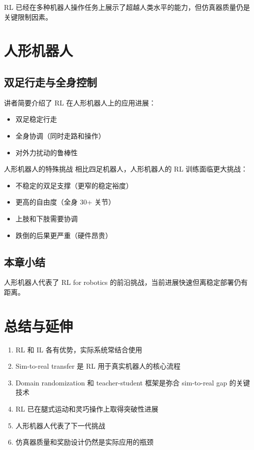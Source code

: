 \documentclass[a4paper]{article}
\begin{document}
RL 已经在多种机器人操作任务上展示了超越人类水平的能力，但仿真器质量仍是关键限制因素。

\section{人形机器人}

\subsection{双足行走与全身控制}

讲者简要介绍了 RL 在人形机器人上的应用进展：
\begin{itemize}
    \item 双足稳定行走
    \item 全身协调（同时走路和操作）
    \item 对外力扰动的鲁棒性
\end{itemize}

\begin{knowledgebox}{人形机器人的特殊挑战}
相比四足机器人，人形机器人的 RL 训练面临更大挑战：
\begin{itemize}
    \item 不稳定的双足支撑（更窄的稳定裕度）
    \item 更高的自由度（全身 30+ 关节）
    \item 上肢和下肢需要协调
    \item 跌倒的后果更严重（硬件昂贵）
\end{itemize}
\end{knowledgebox}

\subsection{本章小结}

人形机器人代表了 RL for robotics 的前沿挑战，当前进展快速但离稳定部署仍有距离。

\section{总结与延伸}

\begin{enumerate}
    \item RL 和 IL 各有优势，实际系统常结合使用
    \item Sim-to-real transfer 是 RL 用于真实机器人的核心流程
    \item Domain randomization 和 teacher-student 框架是弥合 sim-to-real gap 的关键技术
    \item RL 已在腿式运动和灵巧操作上取得突破性进展
    \item 人形机器人代表了下一代挑战
    \item 仿真器质量和奖励设计仍然是实际应用的瓶颈
\end{enumerate}
\end{document}
